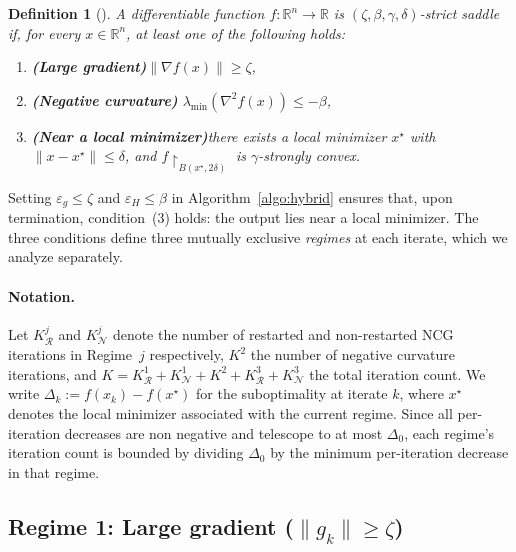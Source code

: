 \documentclass{article}
\newtheorem{definition}{Definition}
\begin{document}
\begin{definition}[\cite{GeSaddle15}]
\label{def:strict_saddle}
A differentiable function $f:\mathbb{R}^n\to\mathbb{R}$ is
$(\zeta,\beta,\gamma,\delta)$-\emph{strict saddle} if, for every
$x\in\mathbb{R}^n$, at least one of the following holds:
\begin{enumerate}
  \item \textbf{(Large gradient)}\quad $\|\nabla f(x)\|\geq\zeta$,
  \item \textbf{(Negative curvature)}\quad
        $\lambda_{\min}(\nabla^2 f(x))\leq-\beta$,
  \item \textbf{(Near a local minimizer)}\quad there exists a local
        minimizer $x^\star$ with $\|x-x^\star\|\leq\delta$, and
        $f\!\restriction_{B(x^\star,2\delta)}$ is $\gamma$-strongly convex.
\end{enumerate}
\end{definition}

Setting $\varepsilon_g\leq\zeta$ and $\varepsilon_H\leq\beta$ in
Algorithm~\ref{algo:hybrid} ensures that, upon termination,
condition~(3) holds: the output lies near a local minimizer. The three
conditions define three mutually exclusive \emph{regimes} at each
iterate, which we analyze separately.

\paragraph{Notation.}
Let $K^j_{\mathcal{R}}$ and $K^j_{\mathcal{N}}$ denote the number
of restarted and non-restarted NCG iterations in Regime~$j$
respectively, $K^2$ the number of negative curvature iterations,
and $K = K^1_{\mathcal{R}} + K^1_{\mathcal{N}} + K^2 +
K^3_{\mathcal{R}} + K^3_{\mathcal{N}}$ the total iteration count.
We write $\Delta_k := f(x_k) - f(x^\star)$ for the suboptimality
at iterate $k$, where $x^\star$ denotes the local minimizer
associated with the current regime. Since all per-iteration
decreases are non negative and telescope to at most $\Delta_0$, each
regime's iteration count is bounded by dividing $\Delta_0$ by the
minimum per-iteration decrease in that regime.

\subsection{Regime 1: Large gradient ($\|g_k\|\geq\zeta$)}
\end{document}
